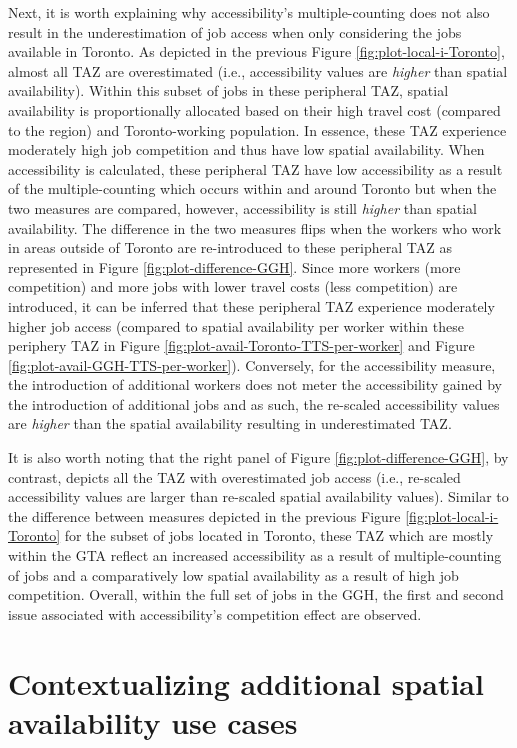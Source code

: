 \documentclass[]{elsarticle} %
\begin{document}
Next, it is worth explaining why accessibility's multiple-counting does
not also result in the underestimation of job access when only
considering the jobs available in Toronto. As depicted in the previous
Figure \ref{fig:plot-local-i-Toronto}, almost all TAZ are overestimated
(i.e., accessibility values are \emph{higher} than spatial
availability). Within this subset of jobs in these peripheral TAZ,
spatial availability is proportionally allocated based on their high
travel cost (compared to the region) and Toronto-working population. In
essence, these TAZ experience moderately high job competition and thus
have low spatial availability. When accessibility is calculated, these
peripheral TAZ have low accessibility as a result of the
multiple-counting which occurs within and around Toronto but when the
two measures are compared, however, accessibility is still \emph{higher}
than spatial availability. The difference in the two measures flips when
the workers who work in areas outside of Toronto are re-introduced to
these peripheral TAZ as represented in Figure
\ref{fig:plot-difference-GGH}. Since more workers (more competition) and
more jobs with lower travel costs (less competition) are introduced, it
can be inferred that these peripheral TAZ experience moderately higher
job access (compared to spatial availability per worker within these
periphery TAZ in Figure \ref{fig:plot-avail-Toronto-TTS-per-worker} and
Figure \ref{fig:plot-avail-GGH-TTS-per-worker}). Conversely, for the
accessibility measure, the introduction of additional workers does not
meter the accessibility gained by the introduction of additional jobs
and as such, the re-scaled accessibility values are \emph{higher} than
the spatial availability resulting in underestimated TAZ.

It is also worth noting that the right panel of Figure
\ref{fig:plot-difference-GGH}, by contrast, depicts all the TAZ with
overestimated job access (i.e., re-scaled accessibility values are
larger than re-scaled spatial availability values). Similar to the
difference between measures depicted in the previous Figure
\ref{fig:plot-local-i-Toronto} for the subset of jobs located in
Toronto, these TAZ which are mostly within the GTA reflect an increased
accessibility as a result of multiple-counting of jobs and a
comparatively low spatial availability as a result of high job
competition. Overall, within the full set of jobs in the GGH, the first
and second issue associated with accessibility's competition effect are
observed.

\hypertarget{contextualizing-additional-spatial-availability-use-cases}{%
\section{Contextualizing additional spatial availability use
cases}\label{contextualizing-additional-spatial-availability-use-cases}}
\end{document}
